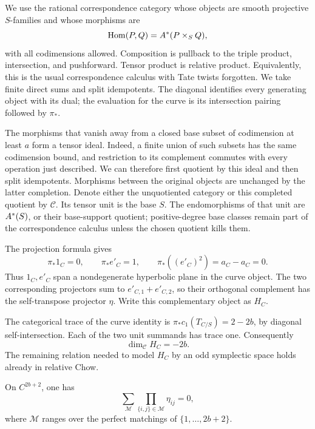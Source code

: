 We use the rational correspondence category whose objects are smooth
projective \(S\)-families and whose morphisms are
\[
 \operatorname{Hom}(P,Q)=A^*(P\times_S Q),
\]
with all codimensions allowed.  Composition is pullback to the triple
product, intersection, and pushforward.  Tensor product is relative
product.  Equivalently, this is the usual correspondence calculus with
Tate twists forgotten.  We take finite direct sums and split
idempotents.  The diagonal identifies every generating object with its
dual; the evaluation for the curve is its intersection pairing followed
by \(\pi_*\).

The morphisms that vanish away from a closed base subset of codimension
at least \(a\) form a tensor ideal.  Indeed, a finite union of such
subsets has the same codimension bound, and restriction to its
complement commutes with every operation just described.  We can
therefore first quotient by this ideal and then split idempotents.
Morphisms between the original objects are unchanged by the latter
completion.  Denote either the unquotiented category or this completed
quotient by \(\mathcal C\).
Its tensor unit is the base \(S\).  The endomorphisms of that unit are
\(A^*(S)\), or their base-support quotient; positive-degree base
classes remain part of the correspondence calculus unless the chosen
quotient kills them.

The projection formula gives
\begin{equation}
 \label{eq:hyperbolic-normalization}
 \pi_*1_C=0,\qquad
 \pi_*e'_C=1,\qquad
 \pi_*((e'_C)^2)=a_C-a_C=0.
\end{equation}
Thus \(1_C,e'_C\) span a nondegenerate hyperbolic plane in the curve
object.  The two corresponding projectors sum to
\(e'_{C,1}+e'_{C,2}\), so their orthogonal complement has the
self-transpose projector \(\eta\).  Write this complementary object as
\(H_C\).

The categorical trace of the curve identity is
\(\pi_*c_1(T_{C/S})=2-2b\), by diagonal self-intersection.  Each of the
two unit summands has trace one.  Consequently
\begin{equation}
 \label{eq:odd-curve-dimension}
 \dim_{\mathcal C}H_C=-2b.
\end{equation}
The remaining relation needed to model \(H_C\) by an odd symplectic
space holds already in relative Chow.

\begin{lemma}
 \label{lem:relative-pfaffian}
On \(C^{2b+2}\), one has
\begin{equation}
 \label{eq:relative-pfaffian}
 \sum_{\mathcal M}
   \prod_{\{i,j\}\in\mathcal M}\eta_{ij}=0,
\end{equation}
where \(\mathcal M\) ranges over the perfect matchings of
\(\{1,\ldots,2b+2\}\).
\end{lemma}

